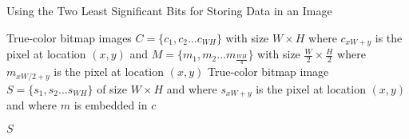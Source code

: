 \begin{algorithm}
\caption{Using the Two Least Significant Bits for Storing Data in an Image}
\label{alg1}
\begin{algorithmic}
\REQUIRE True-color bitmap images $C = \{c_1,c_2\ldots c_{WH}\}$ with size $W \times H$ where $c_{xW+y}$ is the pixel at location $(x,y)$ and $M  = \{m_1,m_2\ldots m_{\frac{WH}{4}}\}$ with size $\frac{W}{2} \times \frac{H}{2}$ where $m_{xW/2+y}$ is the pixel at location $(x,y)$
\ENSURE True-color bitmap image $S  = \{s_1,s_2\ldots s_{WH}\}$ of size $W \times H$ and where $s_{xW+y}$ is the pixel at location $(x,y)$ and where $m$ is embedded in $c$




	\ENDFOR
\ENDFOR

\RETURN $S$
\end{algorithmic}
\end{algorithm}